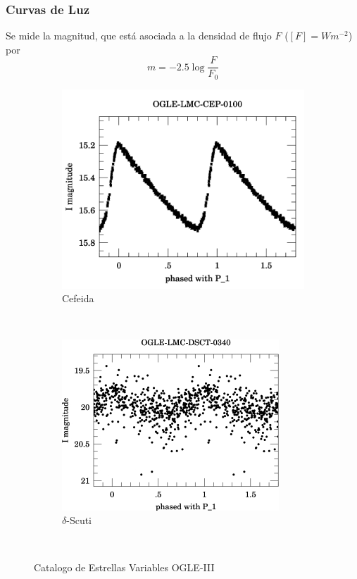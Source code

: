 \documentclass{beamer}
\begin{document}
\begin{frame}
  \frametitle{Curvas de Luz}
  Se mide la magnitud, que está asociada a la densidad de flujo $F$ ($[F] = Wm^{-2}$) por 
  \begin{equation}
    m = -2.5\log \frac{F}{F_0}
  \end{equation} 
  \begin{figure}
    \centering
    \begin{subfigure}[b]{0.4\textwidth}
      \includegraphics[width=\textwidth]{./img/OGLE-LMC-CEP-0100_1.png}
      \caption{Cefeida}
      \label{fig:gull}
    \end{subfigure}%
    ~ %
    \begin{subfigure}[b]{0.4\textwidth}
      \includegraphics[width=\textwidth]{./img/OGLE-LMC-DSCT-0340_1.jpg}
      \caption{$\delta$-Scuti}
      \label{fig:tiger}
    \end{subfigure}
    ~ %
    \caption{Catalogo de Estrellas Variables OGLE-III}\label{fig:animals}
  \end{figure}


\end{frame}
\end{document}
